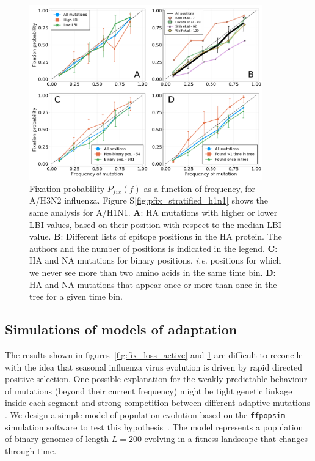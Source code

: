 \documentclass[reprint,amsmath,amssymb,superscriptaddress,showpacs,rmp]{revtex4-1}
\newcommand{\sref}[1]{S\ref{#1}}
\begin{document}
\begin{figure}
	\centering
	\includegraphics[width=0.9\textwidth]{./Figures/Panel3.png}
	\caption{Fixation probability $P_{fix}(f)$ as a function of frequency, for A/H3N2 influenza. Figure \sref{fig:pfix_stratified_h1n1} shows the same analysis for A/H1N1. \textbf{A}: HA mutations with higher or lower LBI values, based on their position with respect to the median LBI value. \textbf{B}: Different lists of epitope positions in the HA protein. The authors and the number of positions is indicated in the legend. \textbf{C}: HA and NA mutations for binary positions, \emph{i.e.} positions for which we never see more than two amino acids in the same time bin. \textbf{D}: HA and NA mutations that appear once or more than once in the tree for a given time bin.}
	\label{fig:pfix_stratified}
\end{figure}

\subsection*{Simulations of models of adaptation}
\label{sub:a_simple_model}

The results shown in figures~\ref{fig:fix_loss_active} and \ref{fig:pfix_stratified} are difficult to reconcile with the idea that seasonal influenza virus evolution is driven by rapid directed positive selection.
One possible explanation for the weakly predictable behaviour of mutations (beyond their current frequency) might be tight genetic linkage inside each segment and strong competition between different adaptive mutations \citep{neher_genetic_2011,strelkowa_clonal_2012}. 
We design a simple model of population evolution based on the \texttt{ffpopsim} simulation software to test this hypothesis~\cite{10.1093/bioinformatics/bts633}. 
The model represents a population of binary genomes of length $L=200$ evolving in a fitness landscape that changes through time. 
\end{document}
